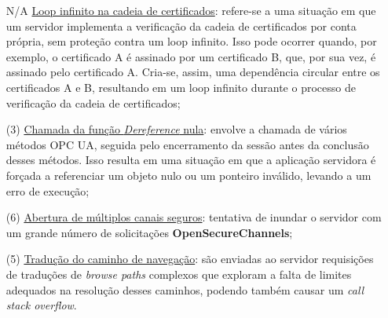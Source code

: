         \begin{itemize}
            \item[N/A] \underline{Loop infinito na cadeia de certificados}: refere-se a uma situação em que um servidor implementa a verificação da cadeia de certificados por conta própria, sem proteção contra um loop infinito. Isso pode ocorrer quando, por exemplo, o certificado A é assinado por um certificado B, que, por sua vez, é assinado pelo certificado A. Cria-se, assim, uma dependência circular entre os certificados A e B, resultando em um loop infinito durante o processo de verificação da cadeia de certificados;
            \item[(3)] \underline{Chamada da função \textit{Dereference} nula}: envolve a chamada de vários métodos OPC UA, seguida pelo encerramento da sessão antes da conclusão desses métodos. Isso resulta em uma situação em que a aplicação servidora é forçada a referenciar um objeto nulo ou um ponteiro inválido, levando a um erro de execução;
            \item[(6)] \underline{Abertura de múltiplos canais seguros}: tentativa de inundar o servidor com um grande número de solicitações \textbf{OpenSecureChannels};
            \item[(5)] \underline{Tradução do caminho de navegação}: são enviadas ao servidor requisições de traduções de \textit{browse paths} complexos que exploram a falta de limites adequados na resolução desses caminhos, podendo também causar um \textit{call stack overflow}.

\end{itemize}
